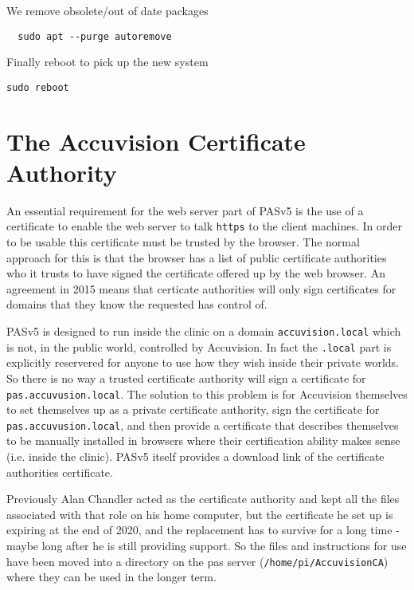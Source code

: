 \documentclass[Draft]{akc}
\begin{document}
We remove obsolete/out of date packages
\begin{lstlisting}
  sudo apt --purge autoremove
\end{lstlisting}
Finally reboot to pick up the new system
\begin{lstlisting}
sudo reboot
\end{lstlisting}
\section {The Accuvision Certificate Authority}

An essential requirement for the web server part of PASv5 is the use of a certificate to enable the web server to talk \texttt{https} to
the client machines.  In order to be usable this certificate must be trusted by the browser.  The normal approach for this is that the browser
has a list of public certificate authorities who it trusts to have signed the certificate offered up by the web browser.  An agreement in 2015
means that certicate authorities will only sign certificates for domains that they know the requested has control of.

PASv5 is designed to run inside the clinic on a domain \texttt{accuvision.local} which is not, in the public world, controlled by Accuvision. In
fact the \texttt{.local} part is explicitly reservered for anyone to use how they wish inside their private worlds.  So there is no way a trusted
certificate authority will sign a certificate for \texttt{pas.accuvusion.local}.  The solution to this problem is for Accuvision themselves to set
themselves up as a private certificate authority, sign the certificate for \texttt{pas.accuvusion.local}, and then provide a certificate that describes
themselves to be manually installed in browsers where their certification ability makes sense (i.e. inside the clinic).  PASv5 itself provides a download
link of the certificate authorities certificate.

Previously Alan Chandler acted as the certificate authority and kept all the files associated with that role on his home computer, but the certificate he
set up is expiring at the end of 2020, and the replacement has to survive for a long time - maybe long after he is still providing support.  So the files
and instructions for use have been moved into a directory on the pas server (\texttt{/home/pi/AccuvisionCA}) where they can be used in the longer term.
\end{document}
